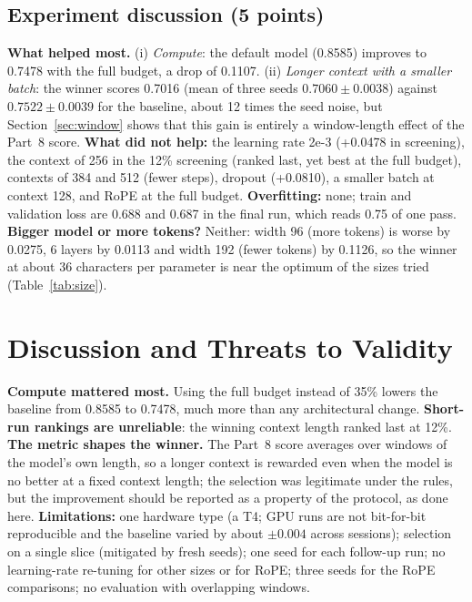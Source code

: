 \documentclass[10pt,twocolumn]{article}
\begin{document}
\subsection*{Experiment discussion (5 points)}
\textbf{What helped most.} (i) \emph{Compute}: the default model (0.8585) improves to 0.7478 with the full budget, a drop of 0.1107. (ii) \emph{Longer context with a smaller batch}: the winner scores 0.7016 (mean of three seeds $0.7060\pm0.0038$) against $0.7522\pm0.0039$ for the baseline, about 12 times the seed noise, but Section~\ref{sec:window} shows that this gain is entirely a window-length effect of the Part~8 score. \textbf{What did not help:} the learning rate 2e-3 (+0.0478 in screening), the context of 256 in the 12\% screening (ranked last, yet best at the full budget), contexts of 384 and 512 (fewer steps), dropout (+0.0810), a smaller batch at context 128, and RoPE at the full budget. \textbf{Overfitting:} none; train and validation loss are 0.688 and 0.687 in the final run, which reads 0.75 of one pass. \textbf{Bigger model or more tokens?} Neither: width 96 (more tokens) is worse by 0.0275, 6 layers by 0.0113 and width 192 (fewer tokens) by 0.1126, so the winner at about 36 characters per parameter is near the optimum of the sizes tried (Table~\ref{tab:size}).

\section{Discussion and Threats to Validity}
\textbf{Compute mattered most.} Using the full budget instead of 35\% lowers the baseline from 0.8585 to 0.7478, much more than any architectural change. \textbf{Short-run rankings are unreliable}: the winning context length ranked last at 12\%. \textbf{The metric shapes the winner.} The Part~8 score averages over windows of the model's own length, so a longer context is rewarded even when the model is no better at a fixed context length; the selection was legitimate under the rules, but the improvement should be reported as a property of the protocol, as done here. \textbf{Limitations:} one hardware type (a T4; GPU runs are not bit-for-bit reproducible and the baseline varied by about $\pm0.004$ across sessions); selection on a single slice (mitigated by fresh seeds); one seed for each follow-up run; no learning-rate re-tuning for other sizes or for RoPE; three seeds for the RoPE comparisons; no evaluation with overlapping windows.
\end{document}
